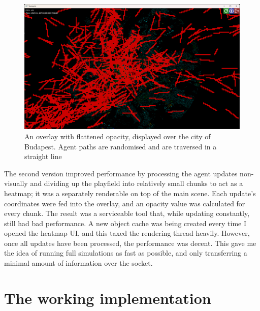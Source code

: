 \begin{figure}[h]
    \centering
    \includegraphics[width=140mm, keepaspectratio]{images/overlay_v2.png}
    \caption{An overlay with flattened opacity, displayed over the city of Budapest. Agent paths are randomised and are traversed in a straight line\ \label{overlay_v2}}
\end{figure}
The second version improved performance by processing the agent updates non-visually and dividing up the playfield into relatively small chunks to act as a heatmap; it was a separately renderable on top of the main scene. Each update's coordinates were fed into the overlay, and an opacity value was calculated for every chunk. The result was a serviceable tool that, while updating constantly, still had bad performance. A new object cache was being created every time I opened the heatmap UI, and this taxed the rendering thread heavily. However, once all updates have been processed, the performance was decent. This gave me the idea of running full simulations as fast as possible, and only transferring a minimal amount of information over the socket.

\section{The working implementation}

